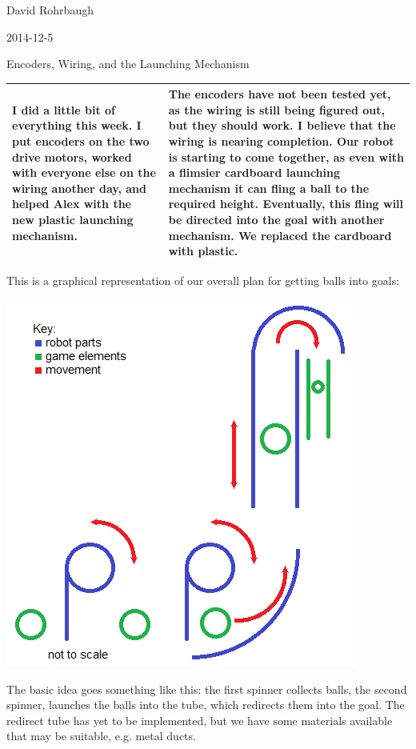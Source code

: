 David Rohrbaugh

2014-12-5

Encoders, Wiring, and the Launching Mechanism

\begin{tabular}{|p{5cm}|p{5cm}|}
 \hline
 I did a little bit of everything this week. I put encoders on the two drive motors, worked with everyone else on the wiring another day, and helped Alex with the new plastic launching mechanism.
 &
 The encoders have not been tested yet, as the wiring is still being figured out, but they should work. I believe that the wiring is nearing completion. Our robot is starting to come together, as even with a flimsier cardboard launching mechanism it can fling a ball to the required height. Eventually, this fling will be directed into the goal with another mechanism. We replaced the cardboard with plastic.
 \\
 \hline
\end{tabular}

\medskip

This is a graphical representation of our overall plan for getting balls into goals:

\begin{center}
 \includegraphics{./Entries/Images/scoring_design.png}
\end{center}

The basic idea goes something like this: the first spinner collects balls, the second spinner, launches the balls into the tube, which redirects them into the goal.
The redirect tube has yet to be implemented, but we have some materials available that may be suitable, e.g. metal ducts.
